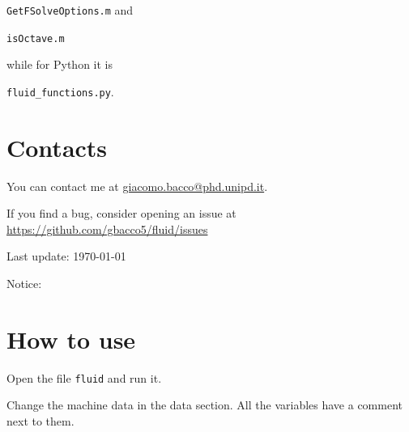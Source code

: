 \documentclass[b5paper,11pt,oneside,fleqn]{article}
\begin{document}
\texttt{GetFSolveOptions.m} and

\texttt{isOctave.m}


\noindent
while for Python it is


\texttt{fluid\_functions.py}.



\newpage

\section*{Contacts}
You can contact me at
\href{mailto:giacomo.bacco@phd.unipd.it}{giacomo.bacco@phd.unipd.it}.

If you find a bug, consider opening an issue at 
\url{https://github.com/gbacco5/fluid/issues}

\vfill
{\footnotesize\noindent  Last update: \today}

\vspace{3cm}
Notice:




\clearpage
\section{How to use}

Open the file \lstinline|fluid| and run it.

Change the machine data in the data section.
All the variables have a comment next to them.
\end{document}

